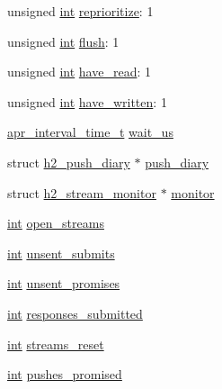 \begin{DoxyCompactItemize}
\item 
unsigned \hyperlink{pcre_8txt_a42dfa4ff673c82d8efe7144098fbc198}{int} \hyperlink{structh2__session_a33f68aadb94445194546fc611380a203}{reprioritize}\+: 1
\item 
unsigned \hyperlink{pcre_8txt_a42dfa4ff673c82d8efe7144098fbc198}{int} \hyperlink{structh2__session_a8b69c69f54c8d00ed834802439a3c9ef}{flush}\+: 1
\item 
unsigned \hyperlink{pcre_8txt_a42dfa4ff673c82d8efe7144098fbc198}{int} \hyperlink{structh2__session_abc16a59b34afed1ea2a9297107b01229}{have\+\_\+read}\+: 1
\item 
unsigned \hyperlink{pcre_8txt_a42dfa4ff673c82d8efe7144098fbc198}{int} \hyperlink{structh2__session_ab8e651535bc36b8db8768471332ce4fa}{have\+\_\+written}\+: 1
\item 
\hyperlink{group__apr__time_gaae2129185a395cc393f76fabf4f43e47}{apr\+\_\+interval\+\_\+time\+\_\+t} \hyperlink{structh2__session_a34ee9d398f9b88dbf2c3ee53ee97875a}{wait\+\_\+us}
\item 
struct \hyperlink{structh2__push__diary}{h2\+\_\+push\+\_\+diary} $\ast$ \hyperlink{structh2__session_a252ee2bfdfc80fd135875274855cdf2b}{push\+\_\+diary}
\item 
struct \hyperlink{structh2__stream__monitor}{h2\+\_\+stream\+\_\+monitor} $\ast$ \hyperlink{structh2__session_aae4758b20d0ba0c4d3642298ed900029}{monitor}
\item 
\hyperlink{pcre_8txt_a42dfa4ff673c82d8efe7144098fbc198}{int} \hyperlink{structh2__session_a604a5590a0033434c6def4d0ce7b4cfc}{open\+\_\+streams}
\item 
\hyperlink{pcre_8txt_a42dfa4ff673c82d8efe7144098fbc198}{int} \hyperlink{structh2__session_a3d02d3d92cddb69d0850e2b790ca1893}{unsent\+\_\+submits}
\item 
\hyperlink{pcre_8txt_a42dfa4ff673c82d8efe7144098fbc198}{int} \hyperlink{structh2__session_abbd1515c131f6aa11b07a915fc3db0ab}{unsent\+\_\+promises}
\item 
\hyperlink{pcre_8txt_a42dfa4ff673c82d8efe7144098fbc198}{int} \hyperlink{structh2__session_a459288e14e2c010542eeb6efc9562964}{responses\+\_\+submitted}
\item 
\hyperlink{pcre_8txt_a42dfa4ff673c82d8efe7144098fbc198}{int} \hyperlink{structh2__session_a2a1ec97d5e94b5a589223d7ae643b1a0}{streams\+\_\+reset}
\item 
\hyperlink{pcre_8txt_a42dfa4ff673c82d8efe7144098fbc198}{int} \hyperlink{structh2__session_ae51a5ef37580861fcaafccdb00352be8}{pushes\+\_\+promised}
\item 

\end{DoxyCompactItemize}
